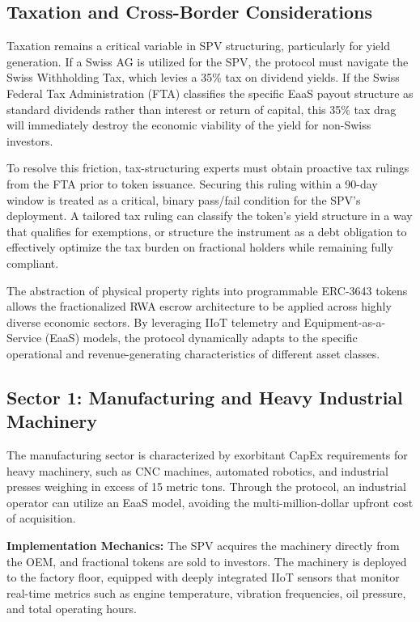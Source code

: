 \documentclass{Resources/bdlt-project}
\begin{document}
\subsection{Taxation and Cross-Border Considerations}
Taxation remains a critical variable in SPV structuring, particularly for yield generation. If a Swiss AG is utilized for the SPV, the protocol must navigate the Swiss Withholding Tax, which levies a 35\% tax on dividend yields. If the Swiss Federal Tax Administration (FTA) classifies the specific EaaS payout structure as standard dividends rather than interest or return of capital, this 35\% tax drag will immediately destroy the economic viability of the yield for non-Swiss investors.

To resolve this friction, tax-structuring experts must obtain proactive tax rulings from the FTA prior to token issuance. Securing this ruling within a 90-day window is treated as a critical, binary pass/fail condition for the SPV's deployment. A tailored tax ruling can classify the token's yield structure in a way that qualifies for exemptions, or structure the instrument as a debt obligation to effectively optimize the tax burden on fractional holders while remaining fully compliant.

The abstraction of physical property rights into programmable ERC-3643 tokens allows the fractionalized RWA escrow architecture to be applied across highly diverse economic sectors. By leveraging IIoT telemetry and Equipment-as-a-Service (EaaS) models, the protocol dynamically adapts to the specific operational and revenue-generating characteristics of different asset classes.

\subsection{Sector 1: Manufacturing and Heavy Industrial Machinery}
The manufacturing sector is characterized by exorbitant CapEx requirements for heavy machinery, such as CNC machines, automated robotics, and industrial presses weighing in excess of 15 metric tons. Through the protocol, an industrial operator can utilize an EaaS model, avoiding the multi-million-dollar upfront cost of acquisition.

\textbf{Implementation Mechanics:}
The SPV acquires the machinery directly from the OEM, and fractional tokens are sold to investors. The machinery is deployed to the factory floor, equipped with deeply integrated IIoT sensors that monitor real-time metrics such as engine temperature, vibration frequencies, oil pressure, and total operating hours.
\end{document}
